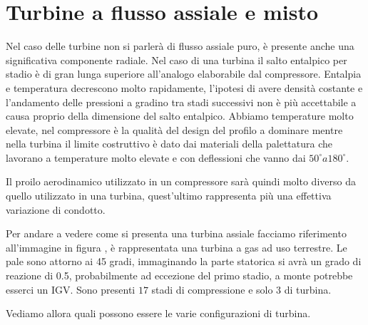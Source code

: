 \chapter{Turbine a flusso assiale e misto}

Nel caso delle turbine non si parlerà di flusso assiale puro, è presente anche una significativa componente radiale. Nel caso di una turbina il salto entalpico per stadio è di gran lunga superiore all'analogo elaborabile dal compressore. Entalpia e temperatura decrescono molto rapidamente, l'ipotesi di avere densità costante e l'andamento delle pressioni a gradino tra stadi successivi non è più accettabile a causa proprio della dimensione del salto entalpico. Abbiamo temperature molto elevate, nel compressore è la qualità del design del profilo a dominare mentre nella turbina il limite costruttivo è dato dai materiali della palettatura che lavorano a temperature molto elevate e con deflessioni che vanno dai $50^{\circ} a 180^{\circ}$. 

Il proilo aerodinamico utilizzato in un compressore sarà quindi molto diverso da quello utilizzato in una turbina, quest'ultimo rappresenta più una effettiva variazione di condotto. 

Per andare a vedere come si presenta una turbina assiale facciamo riferimento all'immagine in figura , è rappresentata una turbina a gas ad uso terrestre. Le pale sono attorno ai 45 gradi, immaginando la parte statorica si avrà un grado di reazione di 0.5, probabilmente ad eccezione del primo stadio, a monte potrebbe esserci un IGV. Sono presenti $17$ stadi di compressione e solo $3$ di turbina. 

Vediamo allora quali possono essere le varie configurazioni di turbina. 
\